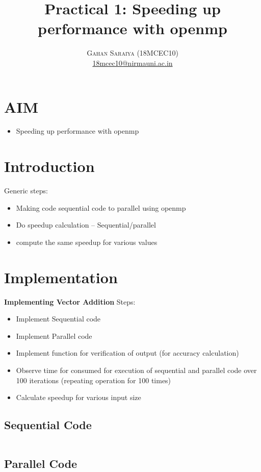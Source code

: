 \documentclass[paper=letter, fontsize=12pt]{article}
\title{\vspace{-15mm}\fontsize{24pt}{10pt}\selectfont\textbf{Practical 1: Speeding up performance with openmp}} %
\author{
\large
{\textsc{Gahan Saraiya (18MCEC10)}}\\[2mm]
\normalsize \href{mailto:18mcec10@nirmauni.ac.in}{18mcec10@nirmauni.ac.in}\\[2mm] %
}
\date{}
\begin{document}
\maketitle %
\thispagestyle{fancy} %

\section{AIM}
\begin{itemize}
	\item Speeding up performance with openmp
\end{itemize}

\section{Introduction}
Generic steps:
\begin{itemize}
	\item Making code sequential code to parallel using openmp
	\item Do speedup calculation -- Sequential/parallel	
	\item compute the same speedup for various values
\end{itemize}

\section{Implementation}
\textbf{Implementing Vector Addition}
Steps:
\begin{itemize}
	\item Implement Sequential code
	\item Implement Parallel code
	\item Implement function for verification of output (for accuracy calculation)
	\item Observe time for consumed for execution of sequential and parallel code over 100 iterations (repeating operation for 100 times)
	\item Calculate speedup for various input size
\end{itemize}
\subsection{Sequential Code}
\inputminted{c}{../src/main.c}

\subsection{Parallel Code}
\inputminted{c}{../src/vectorAddParallel.c}
\end{document}
